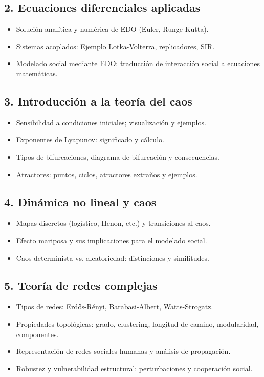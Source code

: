 \documentclass[a4paper,11pt]{article}
\begin{document}
\subsection*{2. Ecuaciones diferenciales aplicadas}
\begin{itemize}[leftmargin=*, label=--]
    \item Solución analítica y numérica de EDO (Euler, Runge-Kutta).
    \item Sistemas acoplados: Ejemplo Lotka-Volterra, replicadores, SIR.
    \item Modelado social mediante EDO: traducción de interacción social a ecuaciones matemáticas.
\end{itemize}

\subsection*{3. Introducción a la teoría del caos}
\begin{itemize}[leftmargin=*, label=--]
    \item Sensibilidad a condiciones iniciales; visualización y ejemplos.
    \item Exponentes de Lyapunov: significado y cálculo.
    \item Tipos de bifurcaciones, diagrama de bifurcación y consecuencias.
    \item Atractores: puntos, ciclos, atractores extraños y ejemplos.
\end{itemize}

\subsection*{4. Dinámica no lineal y caos}
\begin{itemize}[leftmargin=*, label=--]
    \item Mapas discretos (logístico, Henon, etc.) y transiciones al caos.
    \item Efecto mariposa y sus implicaciones para el modelado social.
    \item Caos determinista vs. aleatoriedad: distinciones y similitudes.
\end{itemize}

\subsection*{5. Teoría de redes complejas}
\begin{itemize}[leftmargin=*, label=--]
    \item Tipos de redes: Erdős-Rényi, Barabasi-Albert, Watts-Strogatz.
    \item Propiedades topológicas: grado, clustering, longitud de camino, modularidad, componentes.
    \item Representación de redes sociales humanas y análisis de propagación.
    \item Robustez y vulnerabilidad estructural: perturbaciones y cooperación social.
\end{itemize}
\end{document}
